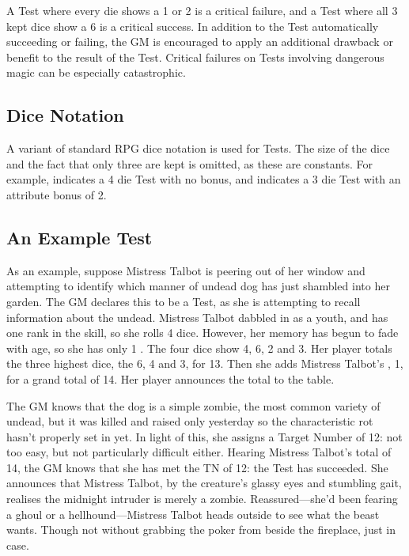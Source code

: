 A Test where every die shows a 1 or 2 is a critical failure, and a Test where all 3 kept dice show a 6 is a critical success.
In addition to the Test automatically succeeding or failing, the GM is encouraged to apply an additional drawback or benefit to the result of the Test.
Critical failures on Tests involving dangerous magic can be especially catastrophic.

\subsection{Dice Notation}

A variant of standard RPG dice notation is used for Tests.
The size of the dice and the fact that only three are kept is omitted, as these are constants.
For example,  indicates a 4 die Test with no bonus, and  indicates a 3 die Test with an attribute bonus of 2.

\subsection{An Example Test}

As an example, suppose Mistress Talbot is peering out of her window and attempting to identify which manner of undead dog has just shambled into her garden.
The GM declares this to be a  Test, as she is attempting to recall information about the undead.
Mistress Talbot dabbled in  as a youth, and has one rank in the skill, so she rolls 4 dice.
However, her memory has begun to fade with age, so she has only 1 .
The four dice show 4, 6, 2 and 3.
Her player totals the three highest dice, the 6, 4 and 3, for 13.
Then she adds Mistress Talbot's , 1, for a grand total of 14.
Her player announces the total to the table.

The GM knows that the dog is a simple zombie, the most common variety of undead, but it was killed and raised only yesterday so the characteristic rot hasn't properly set in yet.
In light of this, she assigns a Target Number of 12: not too easy, but not particularly difficult either.
Hearing Mistress Talbot's total of 14, the GM knows that she has met the TN of 12: the Test has succeeded.
She announces that Mistress Talbot, by the creature's glassy eyes and stumbling gait, realises the midnight intruder is merely a zombie.
Reassured---she'd been fearing a ghoul or a hellhound---Mistress Talbot heads outside to see what the beast wants.
Though not without grabbing the poker from beside the fireplace, just in case.

